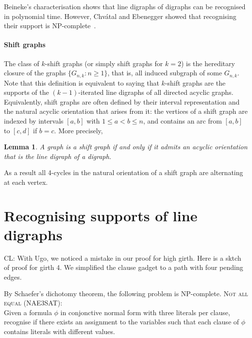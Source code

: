 \documentclass[11pt,a4aper]{article}
\newtheorem{lemma}[theorem]{Lemma}
\newenvironment{csproblem}[1]{\textsc{#1}:\\}{}
\renewcommand{\ge}{\geqslant}
\renewcommand{\le}{\leqslant}
\newcommand{\clement}[1]{{\color{orange} CL: #1}}
\begin{document}
Beineke's characterisation shows that line digraphs of digraphs can be
recognised in polynomial time. However, Chv\'atal and Ebenegger showed that
recognising their support is NP-complete~\cite{chvatal1990Note}.

\paragraph{Shift graphs}
The class of $k$-shift graphs (or simply shift graphs for $k=2$) is the
hereditary closure of the graphs $\{G_{n,k} : n \ge 1\}$, that is, all induced
subgraph of some $G_{n,k}$. Note that this definition is equivalent to saying
that $k$-shift graphs are the supports of the $(k-1)$-iterated line digraphs of
all directed acyclic graphs. Equivalently, shift graphs are often defined by
their interval representation and the natural acyclic orientation that arises
from it: the vertices of a shift graph are indexed by intervals $[a,b]$ with
$1 \le a < b \le n$, and contains an arc from $[a,b]$ to $[c,d]$ if $b = c$. More precisely,
\begin{lemma}
  A graph is a shift graph if and only if it admits an acyclic orientation that
  is the line digraph of a digraph.
\end{lemma}
As a result all 4-cycles in the natural orientation of a shift graph are
alternating at each vertex.

\section{Recognising supports of line digraphs}
\clement{With Ugo, we noticed a mistake in our proof for high girth. Here is a
  sktch of proof for girth 4. We simplified the clause gadget to a path with
  four pending edges.}

By Schaefer's dichotomy theorem, the following problem is NP-complete. 
\begin{csproblem}{Not all equal (NAE3SAT)}
  Given a formula $\phi$ in conjonctive normal form with three literals per
  clause, recognise if there exists an assignment to the variables such that each
  clause of $\phi$ contains literals with different values.    
\end{csproblem}
\end{document}
